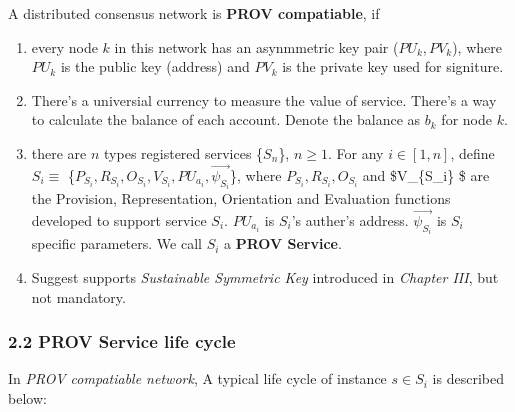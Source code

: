 \documentclass[11pt]{article}
\providecommand{\tightlist}{%
      \setlength{\itemsep}{0pt}\setlength{\parskip}{0pt}}
\begin{document}
A distributed consensus network is \textbf{PROV compatiable}, if

\begin{enumerate}
\def\labelenumi{\arabic{enumi}.}
\tightlist
\item
  every node \(k\) in this network has an asynmmetric key pair
  (\(PU_k, PV_k\)), where \(PU_k\) is the public key (address) and
  \(PV_k\) is the private key used for signiture.
\item
  There's a universial currency to measure the value of service. There's
  a way to calculate the balance of each account. Denote the balance as
  \(b_k\) for node \(k\).
\item
  there are \(n\) types registered services \{\(S_n\)\}, \(n \ge 1\).
  For any \(i \in [1, n]\), define \(S_i \equiv\)
  \{\(P_{S_i},R_{S_i}, O_{S_i}, V_{S_i} , PU_{a_i}, \vec{\psi_{S_i}}\)\},
  where \(P_{S_i},R_{S_i}, O_{S_i}\) and \$V\_\{S\_i\} \$ are the
  Provision, Representation, Orientation and Evaluation functions
  developed to support service \(S_i\). \(PU_{a_i}\) is \(S_i\)'s
  auther's address. \(\vec{\psi_{S_i}}\) is \(S_i\) specific parameters.
  We call \(S_i\) a \textbf{PROV Service}.
\item
  Suggest supports \emph{Sustainable Symmetric Key} introduced in
  \emph{Chapter III}, but not mandatory.
\end{enumerate}

\subsubsection{2.2 PROV Service life
cycle}\label{prov-service-life-cycle}

In \emph{PROV compatiable network}, A typical life cycle of instance
\(s \in S_i\) is described below:
\end{document}
